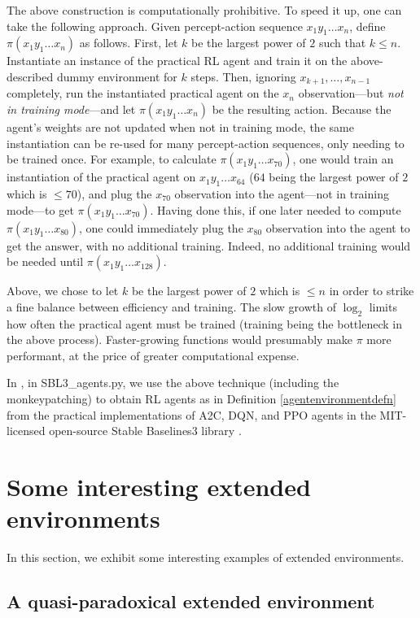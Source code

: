 \documentclass{article}
\begin{document}
The above construction is computationally prohibitive.
To speed it up, one can take the following approach.
Given percept-action sequence $x_1y_1\ldots x_n$,
define $\pi(x_1y_1\ldots x_n)$ as follows.
First, let $k$ be the largest power of $2$ such that $k\leq n$.
Instantiate an instance of the practical RL agent and train it on the
above-described dummy environment for $k$ steps.
Then, ignoring $x_{k+1},\ldots,x_{n-1}$ completely,
run the instantiated practical agent on the $x_n$ observation---but
\emph{not in training mode}---and let
$\pi(x_1y_1\ldots x_n)$ be the resulting action.
Because the agent's weights are not updated when not in training mode,
the same instantiation can be re-used for many percept-action sequences,
only needing to be trained once.
For example, to calculate $\pi(x_1y_1\ldots x_{70})$,
one would train an instantiation of the practical agent on
$x_1y_1\ldots x_{64}$ ($64$ being the largest power of $2$ which is $\leq 70$),
and plug the $x_{70}$ observation into the agent---not in training mode---to get
$\pi(x_1y_1\ldots x_{70})$.
Having done this, if one later needed to compute
$\pi(x_1y_1\ldots x_{80})$, one could immediately plug the $x_{80}$ observation into
the agent to get the answer, with no additional training. Indeed, no additional
training would be needed until $\pi(x_1y_1\ldots x_{128})$.

Above, we chose to let $k$ be the largest power of $2$ which is $\leq n$
in order to strike a fine balance between efficiency and training.
The slow growth of $\log_2$ limits how often the practical agent must be trained
(training being the bottleneck in the above process). Faster-growing functions
would presumably make $\pi$ more performant, at the price of greater computational
expense.

In \cite{library}, in SBL3\_agents.py, we use the above technique
(including the monkeypatching) to obtain RL agents as in Definition \ref{agentenvironmentdefn}
from the practical implementations of A2C, DQN, and PPO
agents in the MIT-licensed open-source
Stable Baselines3 library \cite{stable-baselines3}.

\section{Some interesting extended environments}
\label{examplesection}

In this section, we exhibit some interesting examples of extended environments.

\subsection{A quasi-paradoxical extended environment}
\end{document}
